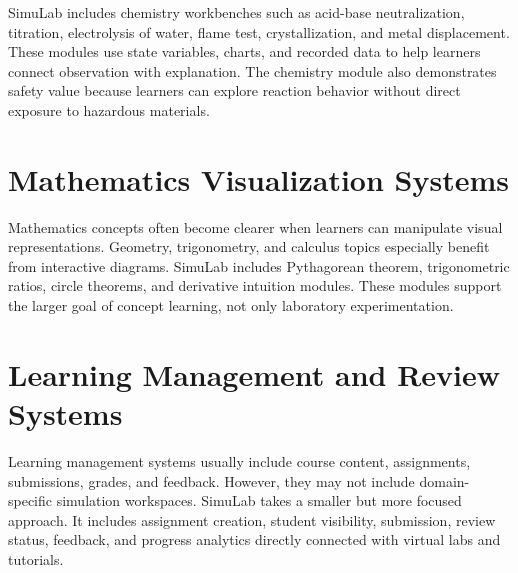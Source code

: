 \documentclass[12pt,a4paper]{report}
\begin{document}
SimuLab includes chemistry workbenches such as acid-base neutralization, titration, electrolysis of water, flame test, crystallization, and metal displacement. These modules use state variables, charts, and recorded data to help learners connect observation with explanation. The chemistry module also demonstrates safety value because learners can explore reaction behavior without direct exposure to hazardous materials.

\section{Mathematics Visualization Systems}
Mathematics concepts often become clearer when learners can manipulate visual representations. Geometry, trigonometry, and calculus topics especially benefit from interactive diagrams. SimuLab includes Pythagorean theorem, trigonometric ratios, circle theorems, and derivative intuition modules. These modules support the larger goal of concept learning, not only laboratory experimentation.

\section{Learning Management and Review Systems}
Learning management systems usually include course content, assignments, submissions, grades, and feedback. However, they may not include domain-specific simulation workspaces. SimuLab takes a smaller but more focused approach. It includes assignment creation, student visibility, submission, review status, feedback, and progress analytics directly connected with virtual labs and tutorials.
\end{document}
